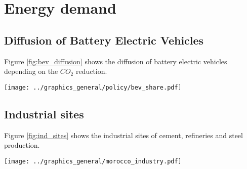 

\section{Energy demand}

\subsection{Diffusion of Battery Electric Vehicles}
\label{subsec:bev_diffusion}
Figure \ref{fig:bev_diffusion} shows the diffusion of battery electric vehicles depending on the $CO_2$ reduction.

\begin{figure*}[h]
    \centering
    \texttt{[image: ../graphics\_general/policy/bev\_share.pdf]}
    \caption{Market diffusion of Battery Electricity Vehicles in Morocco, synthesized based on a s-curve with a growth rate $k=0.2$ and inflection point $x_0=2040$.}
    \label{fig:bev_diffusion}
\end{figure*}

\subsection{Industrial sites}

Figure \ref{fig:ind_sites} shows the industrial sites of cement, refineries and steel production.

\begin{figure*}[h]
    \centering
    \texttt{[image: ../graphics\_general/morocco\_industry.pdf]}
    \caption{Industrial sites in Morocco.}
    \label{fig:ind_sites}
\end{figure*}

\clearpage